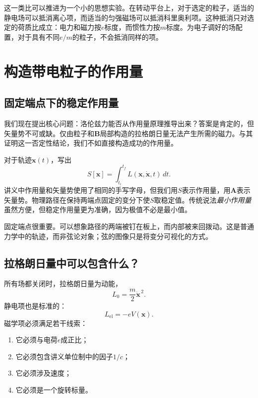 这一类比可以推进为一个小的思想实验。在转动平台上，对于选定的粒子，适当的静电场可以抵消离心项，而适当的匀强磁场可以抵消科里奥利项。这种抵消只对选定的荷质比成立：电力和磁力按\(e\)标度，而惯性力按\(m\)标度。为电子调好的场配置，对于具有不同\(e/m\)的粒子，不会抵消同样的项。

\section{构造带电粒子的作用量}

\subsection{固定端点下的稳定作用量}

我们现在提出核心问题：洛伦兹力能否从作用量原理推导出来？答案是肯定的，但矢量势不可或缺。仅由粒子和\(\mathbf B\)局部构造的拉格朗日量无法产生所需的磁力。与其证明这一否定性结论，我们不如直接构造成功的作用量。

对于轨迹\(\mathbf x(t)\)，写出
\begin{equation}
  S[\mathbf x]
  =
  \int_{t_i}^{t_f}L(\mathbf x,\dot{\mathbf x},t)\,dt.
\end{equation}
讲义中作用量和矢量势使用了相同的手写字母，但我们用\(S\)表示作用量，用\(\mathbf A\)表示矢量势。物理路径在保持两端点固定的变分下使\(S\)取稳定值。传统说法\emph{最小作用量}虽然方便，但稳定作用量更为准确，因为极值不必是最小值。

固定端点很重要。可以想象路径的两端被钉在板上，而内部被来回拨动。这是普通力学中的轨迹，而非弦论对象；弦的图像只是将变分可视化的方式。

\subsection{拉格朗日量中可以包含什么？}

所有场都关闭时，拉格朗日量为动能，
\begin{equation}
  L_0=\frac{m}{2}\dot{\mathbf x}^{\,2}.
\end{equation}
静电项也是标准的：
\begin{equation}
  L_{\mathrm{el}}=-eV(\mathbf x).
\end{equation}
磁学项必须满足若干线索：
\begin{enumerate}
  \item 它必须与电荷\(e\)成正比；
  \item 它必须包含讲义单位制中的因子\(1/c\)；
  \item 它必须涉及速度；
  \item 它必须是一个旋转标量。
\end{enumerate}

